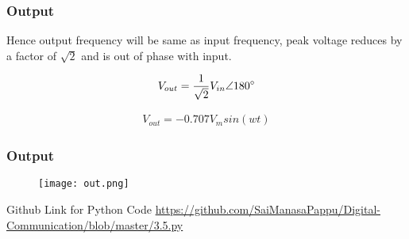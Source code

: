 \documentclass{beamer}
\theoremstyle{remark}
\numberwithin{equation}{section}
\begin{document}
\begin{frame}{}
\frametitle{Output}
    Hence output frequency will be same as input frequency, peak voltage reduces by a factor of ${\sqrt{2}}$ and is out of phase with input.
    \bigbreak
    
\begin{align}
V_{out} = \frac{1}{\sqrt{2}} V_{in} \angle 180 \degree
\end{align}
    
\begin{align}
V_{out} = -0.707V_{m}sin(wt)
\end{align}
    
\end{frame}




\begin{frame}
\frametitle{Output}
\begin{figure}
\centering
\texttt{[image: out.png]}
\end{figure}
\end{frame}


\begin{frame}{Github Link for Python Code }
\url{https://github.com/SaiManasaPappu/Digital-Communication/blob/master/3.5.py}
    
\end{frame}
\end{document}
